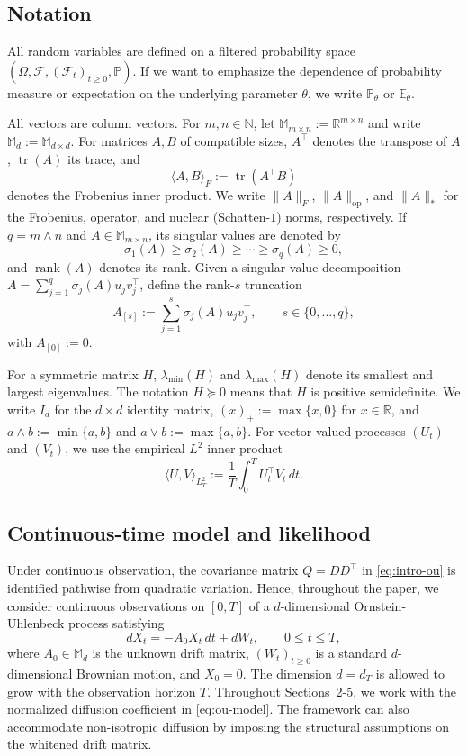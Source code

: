 \documentclass[11pt]{article}
\newcommand{\E}{\mathbb{E}}
\begin{document}
\subsection{Notation}
\label{subsec:notation}

All random variables are defined on a filtered probability space $(\Omega, \mathcal{F}, (\mathcal{F}_t)_{t\geq 0},\mathbb{P})$. If we want to emphasize the dependence of 
probability measure or expectation on the underlying parameter
$\theta$, we write $\mathbb{P}_\theta$ or $\E_\theta$.

All vectors are column vectors. For $m,n\in\mathbb N$, let
$\mathbb M_{m\times n}:=\mathbb R^{m\times n}$ and write
$\mathbb M_d:=\mathbb M_{d\times d}$. For matrices $A,B$ of compatible
sizes, $A^\top$ denotes the transpose of $A$, $\operatorname{tr}(A)$ its trace,
and
\[
    \langle A,B\rangle_F:=\operatorname{tr}(A^\top B)
\]
denotes the Frobenius inner product. We write $\|A\|_F$,
$\|A\|_{\mathrm{op}}$, and $\|A\|_*$ for the Frobenius, operator, and nuclear
(Schatten-$1$) norms, respectively. If $q=m\wedge n$ and
$A\in\mathbb M_{m\times n}$, its singular values are denoted by
\[
    \sigma_1(A)\geq\sigma_2(A)\geq\cdots\geq\sigma_q(A)\geq 0,
\]
and $\operatorname{rank}(A)$ denotes its rank. Given a singular-value
decomposition $A=\sum_{j=1}^q \sigma_j(A)u_jv_j^\top$, define the rank-$s$
truncation
\[
    A_{[s]}:=\sum_{j=1}^s \sigma_j(A)u_jv_j^\top,
    \qquad s\in\{0,\ldots,q\},
\]
with $A_{[0]}:=0$.

For a symmetric matrix $H$, $\lambda_{\min}(H)$ and
$\lambda_{\max}(H)$ denote its smallest and largest eigenvalues. The notation
$H\succeq0$ means that $H$ is positive semidefinite. We write $I_d$ for the
$d\times d$ identity matrix, $(x)_+:=\max\{x,0\}$ for $x\in\mathbb R$, and
$a\wedge b:=\min\{a,b\}$ and $a\vee b:=\max\{a,b\}$. For vector-valued
processes $(U_t)$ and $(V_t)$, we use the empirical $L^2$ inner product
\[
    \langle U,V\rangle_{L^2_T}
    :=\frac{1}{T}\int_0^T U_t^\top V_t\,dt.
\]

\subsection{Continuous-time model and likelihood}
\label{subsec:model-likelihood}

Under continuous observation, the covariance matrix $Q=DD^\top$ in \eqref{eq:intro-ou}  is identified pathwise from quadratic variation. Hence, throughout the paper,
we consider continuous observations on $[0,T]$ of a $d$-dimensional Ornstein-Uhlenbeck
process satisfying
\begin{equation}
    dX_t=-A_0X_t\,dt+dW_t,
    \qquad 0\leq t\leq T,
\label{eq:ou-model}
\end{equation}
where $A_0\in\mathbb M_d$ is the unknown drift matrix, $(W_t)_{t\geq0}$ is a
standard $d$-dimensional Brownian motion, and $X_0=0$. The dimension $d=d_T$ is allowed to grow with the observation horizon $T$. Throughout Sections~2-5, we work with the normalized diffusion coefficient
in \eqref{eq:ou-model}.  The framework can also accommodate non-isotropic diffusion by imposing the structural assumptions on the whitened drift matrix.
\end{document}
